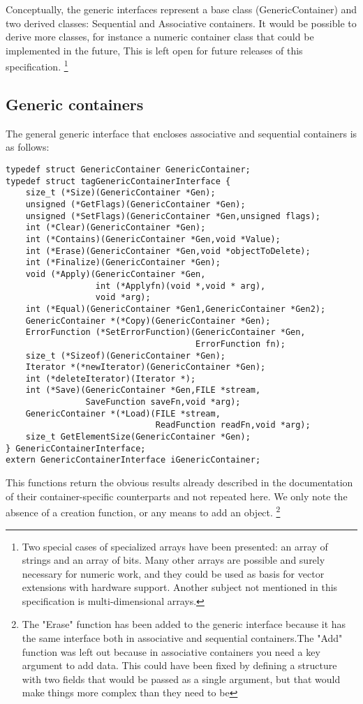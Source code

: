 \documentclass[12pt,a4paper]{memoir} %
\begin{document}
{{Conceptually, the generic interfaces represent a base class (GenericContainer) and two derived classes: Sequential and Associative containers.
It would be possible to derive more classes, for instance a numeric container class that could be implemented in the future, This is left open for future releases of this specification.
\footnote{Two special cases of specialized arrays have been presented: an array of strings and an array of bits. Many other arrays are possible and surely necessary for numeric work, and they could be used as basis for vector extensions with hardware support. Another subject not mentioned in this specification  is multi-dimensional arrays.}
\subsection{Generic containers}
The general generic interface that encloses associative and sequential containers is as follows:
\begin{verbatim}
typedef struct GenericContainer GenericContainer;
typedef struct tagGenericContainerInterface {
    size_t (*Size)(GenericContainer *Gen);
    unsigned (*GetFlags)(GenericContainer *Gen);
    unsigned (*SetFlags)(GenericContainer *Gen,unsigned flags);
    int (*Clear)(GenericContainer *Gen);
    int (*Contains)(GenericContainer *Gen,void *Value);
    int (*Erase)(GenericContainer *Gen,void *objectToDelete);
    int (*Finalize)(GenericContainer *Gen);
    void (*Apply)(GenericContainer *Gen,
                  int (*Applyfn)(void *,void * arg),
                  void *arg);
    int (*Equal)(GenericContainer *Gen1,GenericContainer *Gen2);
    GenericContainer *(*Copy)(GenericContainer *Gen);
    ErrorFunction (*SetErrorFunction)(GenericContainer *Gen,
                                      ErrorFunction fn);
    size_t (*Sizeof)(GenericContainer *Gen);
    Iterator *(*newIterator)(GenericContainer *Gen);
    int (*deleteIterator)(Iterator *);
    int (*Save)(GenericContainer *Gen,FILE *stream, 
                SaveFunction saveFn,void *arg);
    GenericContainer *(*Load)(FILE *stream, 
                              ReadFunction readFn,void *arg);
    size_t GetElementSize(GenericContainer *Gen);
} GenericContainerInterface;
extern GenericContainerInterface iGenericContainer;
\end{verbatim}
This functions return the obvious results already described in the documentation of their container-specific counterparts and not repeated here. We only note the absence of a creation function, or any means to add an object.
\footnote{The "Erase" function  has been added to the generic interface because it has the same interface both in associative and sequential containers.The "Add" function was left out because in associative containers you need a key argument to add data. This could have been fixed by defining a structure with two fields that would be passed as a single argument, but that would make things more complex than they need to be}

}}
\end{document}
